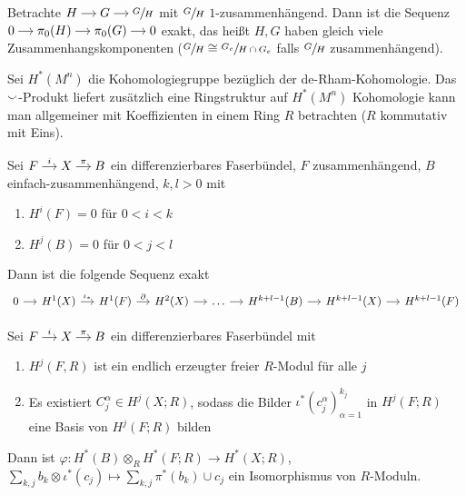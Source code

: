 \begin{beispiel*}
	Betrachte \(
		\begin{tikzcd}[cramped,sep=small]
			H \rar & G \rar & \sfrac{G}{H}
		\end{tikzcd}
	\) mit $\sfrac{G}{H}$ $1$-zusammenhängend.
	Dann ist die Sequenz \(
		\begin{tikzcd}[cramped,sep = small]
			0 \rar & \pi_0(H) \rar & \pi_0(G) \rar &  0
		\end{tikzcd}
	\) exakt, das heißt $H,G$ haben gleich viele Zusammenhangskomponenten ($\sfrac{G}{H} \cong \sfrac{G_e}{H \cap G_e}$ falls $\sfrac{G}{H}$ zusammenhängend).
\end{beispiel*}

Sei $H^*(M^n)$ die Kohomologiegruppe bezüglich der de-Rham-Kohomologie.
Das $\smallsmile$-Produkt liefert zusätzlich eine Ringstruktur auf $H^*(M^n)$
Kohomologie kann man allgemeiner mit Koeffizienten in einem Ring $R$ betrachten ($R$ kommutativ mit Eins).

\begin{satz}[name={Serre-Sequenz, Spanier},label=satz:336]
	Sei \(
		\begin{tikzcd}[cramped,sep=small]
			F \rar["i"] & X \rar["\pi"] & B
		\end{tikzcd}
	\) ein differenzierbares Faserbündel, $F$ zusammenhängend, $B$ einfach-zusammenhängend, $k, l > 0$ mit
	\begin{enumerate}[1)]
		\item $H^i(F)=0$ für $0 < i < k$
		\item $H^j(B)=0$ für $0 < j< l$
	\end{enumerate}
	Dann ist die folgende Sequenz exakt
	\[
		\begin{tikzcd}[sep=small]
			0 \rar & H^1(X) \rar["\iota_*"] & H^1(F) \rar["\partial"] & H^2(X) \rar & \ldots \rar & H^{k+l-1}(B) \rar & H^{k+l-1}(X) \rar & H^{k+l-1} (F)
 		\end{tikzcd}
	\]
\end{satz}

\begin{satz}[name={Leray-Hirsch},label=satz:337]
	Sei \(
		\begin{tikzcd}[cramped,sep=small]
			F \rar["i"] & X \rar["\pi"] & B
		\end{tikzcd}
	\) ein differenzierbares Faserbündel mit
	\begin{enumerate}[1)]
		\item $H^j(F,R)$ ist ein endlich erzeugter freier $R$-Modul für alle $j$
		\item Es existiert $C_j^\alpha \in H^j(X;R)$, sodass die Bilder $\iota^*(c^\alpha_j)^{k_j}_{\alpha=1}$ in $H^j(F;R)$ eine Basis von $H^j(F;R)$ bilden
	\end{enumerate}
	Dann ist $\varphi \colon H^*(B) \otimes_R H^*(F;R) \to H^*(X;R)$, $\sum_{k,j} b_k \otimes \iota^*(c_j) \mapsto \sum_{k,j} \pi^*(b_k) \cup c_j$ ein Isomorphismus von $R$-Moduln.
\end{satz}

